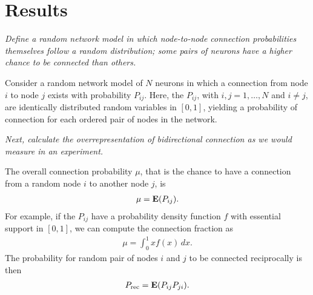 
\section*{Results}

\textit{Define a random network model in which node-to-node connection probabilities themselves follow a random distribution; some pairs of neurons have a higher chance to be connected than others.}


Consider a random network model of $N$ neurons in which a connection from node $i$ to node $j$ exists with probability $P_{ij}$.
%
Here, the $P_{ij}$, with $i,j = 1,\dots,N$ and $i \neq j$, are identically distributed random variables in $[0,1]$, yielding a probability of connection for each ordered pair of nodes in the network.


\textit{Next, calculate the overrepresentation of bidirectional connection as we would measure in an experiment.}

The overall connection probability $\mu$, that is the chance to have a connection from a random node $i$ to another node $j$, is
\begin{align}
\mu = \operatorname{\mathbf{E}}(P_{ij}).
\end{align}
For example, if the $P_{ij}$ have a probability density function $f$ with essential support in $[0,1]$, we can compute the connection fraction as
\begin{align}
  \mu = \int_0^1 x f(x)\,dx.
\end{align}
The probability for random pair of nodes $i$ and $j$ to be connected reciprocally is then
\begin{align}
P_{\mathrm{rec}} = \operatorname{\mathbf{E}}(P_{ij} P_{ji}).
\end{align}


